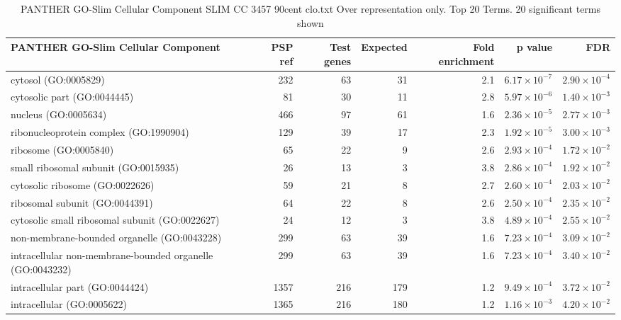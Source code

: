 \begin{table}[ht]
\centering
\begin{adjustbox}{width=\textwidth}

\begin{tabular}{lrrrrrr}
  \hline
PANTHER GO-Slim Cellular Component & PSP ref & Test genes & Expected & Fold enrichment & p value & FDR \\ 
  \hline
cytosol (GO:0005829) & 232 & 63 & 31 & 2.1 & $6.17 \times 10^{-7}$ & $2.90 \times 10^{-4}$ \\ 
  cytosolic part (GO:0044445) & 81 & 30 & 11 & 2.8 & $5.97 \times 10^{-6}$ & $1.40 \times 10^{-3}$ \\ 
  nucleus (GO:0005634) & 466 & 97 & 61 & 1.6 & $2.36 \times 10^{-5}$ & $2.77 \times 10^{-3}$ \\ 
  ribonucleoprotein complex (GO:1990904) & 129 & 39 & 17 & 2.3 & $1.92 \times 10^{-5}$ & $3.00 \times 10^{-3}$ \\ 
  ribosome (GO:0005840) & 65 & 22 & 9 & 2.6 & $2.93 \times 10^{-4}$ & $1.72 \times 10^{-2}$ \\ 
  small ribosomal subunit (GO:0015935) & 26 & 13 & 3 & 3.8 & $2.86 \times 10^{-4}$ & $1.92 \times 10^{-2}$ \\ 
  cytosolic ribosome (GO:0022626) & 59 & 21 & 8 & 2.7 & $2.60 \times 10^{-4}$ & $2.03 \times 10^{-2}$ \\ 
  ribosomal subunit (GO:0044391) & 64 & 22 & 8 & 2.6 & $2.50 \times 10^{-4}$ & $2.35 \times 10^{-2}$ \\ 
  cytosolic small ribosomal subunit (GO:0022627) & 24 & 12 & 3 & 3.8 & $4.89 \times 10^{-4}$ & $2.55 \times 10^{-2}$ \\ 
  non-membrane-bounded organelle (GO:0043228) & 299 & 63 & 39 & 1.6 & $7.23 \times 10^{-4}$ & $3.09 \times 10^{-2}$ \\ 
  intracellular non-membrane-bounded organelle (GO:0043232) & 299 & 63 & 39 & 1.6 & $7.23 \times 10^{-4}$ & $3.40 \times 10^{-2}$ \\ 
  intracellular part (GO:0044424) & 1357 & 216 & 179 & 1.2 & $9.49 \times 10^{-4}$ & $3.72 \times 10^{-2}$ \\ 
  intracellular (GO:0005622) & 1365 & 216 & 180 & 1.2 & $1.16 \times 10^{-3}$ & $4.20 \times 10^{-2}$ \\ 
   \hline
\end{tabular}
\end{adjustbox}
\caption{PANTHER GO-Slim Cellular Component SLIM CC 3457 90cent clo.txt Over representation only. Top 20 Terms. 20 significant terms shown} 
\label{tab:PANTHER GO-Slim Cellular Component SLIM CC 3457 90cent clo.txt Over representation only. Top 20 Terms. 20 significant terms shown}
\end{table}

